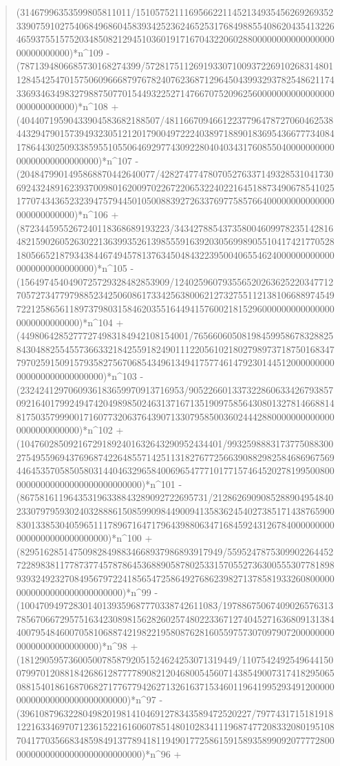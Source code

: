\documentclass[11pt,a4paper]{article}
\theoremstyle{plain}
\theoremstyle{definition}
\begin{document}
\begin{quote}
(31467996353599805811011/1510575211169566221145213493545626926935233907591027540684968604583934252362465253176849885540862043541322646593755157520348508212945103601917167043220602880000000000000000000000000000)*n\^{}109 - (7871394806685730168274399/572817511269193307100937226910268314801128454254701575060966687976782407623687129645043993293782548621174336934634983279887507701544932252714766707520962560000000000000000000000000000)*n\^{}108 + (40440719590433904583682188507/4811667094661223779647872706046253844329479015739493230512120179004972224038971889018369543667773408417864430250933859551055064692977430922804040343176085504000000000000000000000000000)*n\^{}107 - (2048479901495868870442640077/428274774780705276337149328531041730692432489162393700980162009702267220653224022164518873490678541025177074343652323947579445010500883927263376977585766400000000000000000000000000)*n\^{}106 + (8723445955267240118368689193223/3434278854373580046099782351428164821590260526302213639935261398555916392030569989055104174217705281805665218793438446749457813763450484322395004065546240000000000000000000000000000)*n\^{}105 - (1564974540490725729328482853909/1240259607935565202636252203477127057273477979885234250608617334256380062127327551121381066889745497221258656118973798031584620355164494157600218152960000000000000000000000000000)*n\^{}104 + (44980642852777274983184942108154001/76566060508198459958678328825843048825545573663321842559182490111220561021802798973718750168347797025915091579358275670685434961349417577461479230144512000000000000000000000000000)*n\^{}103 - (2324241297060936183659970913716953/9052266013373228606334267938570921640179924947420498985024631371671351909758564308013278146688148175035799900171607732063764390713307958500360244428800000000000000000000000000)*n\^{}102 + (104760285092167291892401632643290952434401/993259888317377508830027549559694376968742264855714251131827677256639088298258468696756944645357058505803144046329658400696547771017715746452027819950080000000000000000000000000000)*n\^{}101 - (867581611964353196338843289092722695731/21286269090852889049548402330797959302403288861508599098449009413583624540273851714387659008301338530405965111789671647179643988063471684592431267840000000000000000000000000000)*n\^{}100 + (829516285147509828498834668937986893917949/55952478753099022644527228983811778737745787864536889058780253315705527363005553077818989393249232708495679722418565472586492768623982713785819332608000000000000000000000000000)*n\^{}99 - (10047094972830140139359687770338742611083/1978867506740902657631378567066729575163423089815628260257480223367127404527163680913138440079548460070581068874219822195808762816055975730709790720000000000000000000000000)*n\^{}98 + (181290595736005007858792051524624253071319449/110754249254964415007997012088184268612877778908212046800545607143854900731741829506508815401861687068271776779426271326163715346011964199529349120000000000000000000000000000)*n\^{}97 - (396108796322804982019814104691278343589472520227/797743171518191812216334697071236152216160607851480102834111968747720833208019510870417703566834859849137789418119490177258615915893589909207777280000000000000000000000000000)*n\^{}96 + 
\end{quote}
\end{document}
